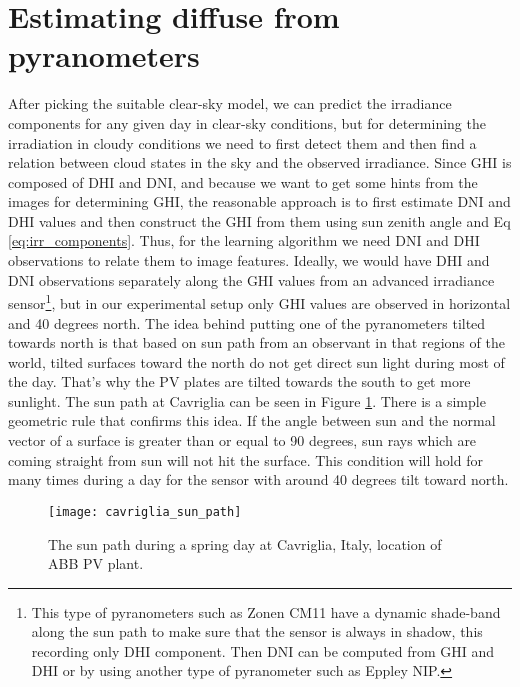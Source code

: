 \section{Estimating diffuse from pyranometers}
After picking the suitable clear-sky model, we can predict the irradiance components for any given day in clear-sky conditions, but for determining the irradiation in cloudy conditions we need to first detect them and then find a relation between cloud states in the sky and the observed irradiance. Since GHI is composed of DHI and DNI, and because we want to get some hints from the images for determining GHI, the reasonable approach is to first estimate DNI and DHI values and then construct the GHI from them using sun zenith angle and Eq \ref{eq:irr_components}. Thus, for the learning algorithm we need DNI and DHI observations to relate them to image features. Ideally, we would have DHI and DNI observations separately along the GHI values from an advanced irradiance sensor\footnote{This type of pyranometers such as Zonen CM11 have a dynamic shade-band along the sun path to make sure that the sensor is always in shadow, this recording only DHI component. Then DNI can be computed from GHI and DHI or by using another type of pyranometer such as Eppley NIP.}, but in our experimental setup only GHI values are observed in horizontal and 40 degrees north. The idea behind putting one of the pyranometers tilted towards north is that based on sun path from an observant in that regions of the world, tilted surfaces toward the north do not get direct sun light during most of the day. That's why the PV plates are tilted towards the south to get more sunlight. The sun path at Cavriglia can be seen in Figure \ref{fig:cavriglia_sun_path}. There is a simple geometric rule that confirms this idea. If the angle between sun and the normal vector of a surface is greater than or equal to 90 degrees, sun rays which are coming straight from sun will not hit the surface. This condition will hold for many times during a day for the sensor with around 40 degrees tilt toward north.

\begin{figure}[h]
\caption{The sun path during a spring day at Cavriglia, Italy, location of ABB PV plant.}
\label{fig:cavriglia_sun_path}
\texttt{[image: cavriglia\_sun\_path]}
\centering
\end{figure}

